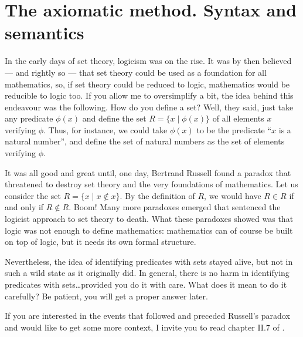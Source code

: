 
\section{The axiomatic method. Syntax and semantics}


\begin{para}
In the early days of set theory, logicism was on the rise.
It was by then believed --- and rightly so --- that set theory could be used as a foundation for all mathematics, so, if set theory could be reduced to logic, mathematics would be reducible to logic too.
If you allow me to oversimplify a bit, the idea behind this endeavour was the following. How do you define a set? Well, they said, just take any predicate $\phi(x)$ and define the set $R = \{x\mid \phi(x)\}$ of all elements $x$ verifying $\phi$.
Thus, for instance, we could take $\phi(x)$ to be the predicate ``$x$ is a natural number'', and define the set of natural numbers as the set of elements verifying $\phi$.

It was all good and great until, one day, Bertrand Russell found a paradox that threatened to destroy set theory and the very foundations of mathematics.
Let us consider the set $R = \{x \mid x \not \in x\}$. By the definition of $R$, we would have $R\in R$ if and only if $R\not\in R$. Boom!
Many more paradoxes emerged that sentenced the logicist approach to set theory to death.
What these paradoxes showed was that logic was not enough to define mathematics: mathematics can of course be built on top of logic, but it needs its own formal structure.

Nevertheless, the idea of identifying predicates with sets stayed alive, but not in such a wild state as it originally did.
In general, there is no harm in identifying predicates with sets\ldots provided you do it with care.
What does it mean to do it carefully? Be patient, you will get a proper answer later.

If you are interested in the events that followed and preceded Russell's paradox and would like to get some more context, I invite you to read chapter II.7 of \cite{Companion}.
\label{logifail}
\end{para}

